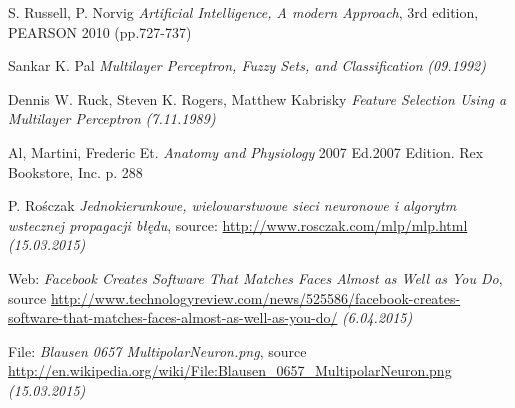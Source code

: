 \begin{thebibliography}{9}
     
    S. Russell, P. Norvig
    \emph{Artificial Intelligence, A modern Approach},
    3rd edition, PEARSON 2010 (pp.727-737)
    
    Sankar K. Pal
    \emph{Multilayer Perceptron, Fuzzy Sets, and Classification}
    \emph{(09.1992)}
    
    Dennis W. Ruck, Steven K. Rogers, Matthew Kabrisky
    \emph{Feature Selection Using a Multilayer Perceptron}
    \emph{(7.11.1989)}
    
    Al, Martini, Frederic Et.
    \emph{Anatomy and Physiology}
    2007 Ed.2007 Edition. Rex Bookstore, Inc. p. 288  
    
     P. Rośczak
     \emph{Jednokierunkowe, wielowarstwowe sieci neuronowe i algorytm wstecznej propagacji błędu},
     source: \url{http://www.rosczak.com/mlp/mlp.html}
     \emph{(15.03.2015)}
    
    Web: \emph{Facebook Creates Software That Matches Faces Almost as Well as You Do},
    source \url{http://www.technologyreview.com/news/525586/facebook-creates-software-that-matches-faces-almost-as-well-as-you-do/}
    \emph{(6.04.2015)}
  
    File: \emph{Blausen 0657 MultipolarNeuron.png},
    source \url{http://en.wikipedia.org/wiki/File:Blausen_0657_MultipolarNeuron.png}
    \emph{(15.03.2015)}

\end{thebibliography}